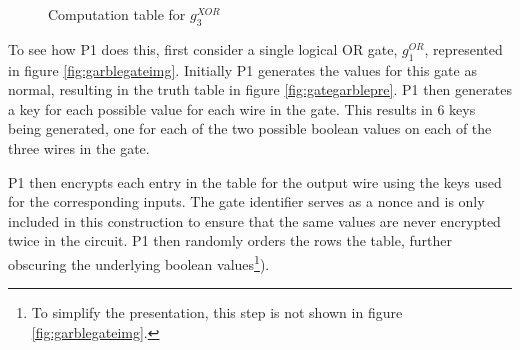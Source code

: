 \begin{figure}[t!]
    \caption{Computation table for $g^{XOR}_3$}
    \label{fig:xorgate}
\end{figure}

To see how \ac{P1} does this, first consider a single logical OR gate, $g^{OR}_1$, represented in figure \ref{fig:garblegateimg}. Initially \ac{P1} generates the values for this gate as normal, resulting in the truth table in figure \ref{fig:gategarblepre}. \ac{P1} then generates a key for each possible value for each wire in the gate.  This results in 6 keys being generated, one for each of the two possible boolean values on each of the three wires in the gate.

\ac{P1} then encrypts each entry in the table for the output wire using the keys used for the corresponding inputs.  The gate identifier serves as a nonce and is only included in this construction to ensure that the same values are never encrypted twice in the circuit.  \ac{P1} then randomly orders the rows the table, further obscuring the underlying boolean values\footnote{To simplify the presentation, this step is not shown in figure \ref{fig:garblegateimg}.}).

